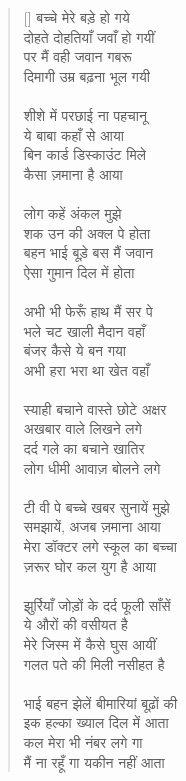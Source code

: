 \begin{verse}[\versewidth]\texthindi{
बच्चे मेरे बड़े हो गये\\
दोहते दोहतियाँ जवाँ हो गयीं\\
पर मैं वही जवान गबरू\\
दिमागी उम्र बढ़ना भूल गयी\\
\\
शीशे में परछाई ना पहचानू\\
ये बाबा कहाँ से आया\\
बिन कार्ड डिस्काउंट मिले\\
कैसा ज़माना है आया\\
\\
लोग कहें अंकल मुझे\\
शक उन की अक्ल पे होता\\
बहन भाई बूड़े बस मैं जवान\\
ऐसा गुमान दिल में होता\\
\\
अभी भी फेरूँ हाथ मैं सर पे\\
भले चट खाली मैदान वहाँ\\
बंजर कैसे ये बन गया\\
अभी हरा भरा था खेत वहाँ\\
\\
स्याही बचाने वास्ते छोटे अक्षर\\
अखबार वाले लिखने लगे\\
दर्द गले का बचाने खातिर\\
लोग धीमी आवाज़ बोलने लगे\\
\\
टी वी पे बच्चे खबर सुनायें मुझे\\
समझायें, अजब ज़माना आया\\
मेरा डॉक्टर लगे स्कूल का बच्चा\\
ज़रूर घोर कल युग है आया\\
\\
झुर्रियाँ जोड़ों के दर्द फूली साँसें\\
ये औरों की वसीयत है\\
मेरे जिस्म में कैसे घुस आयीं\\
गलत पते की मिली नसीहत है\\
\\
 भाई बहन झेलें बीमारियां बूढ़ों की\\
इक हल्का ख्याल दिल में आता\\
कल मेरा भी नंबर लगे गा\\
मैं ना रहूँ गा यकीन नहीं आता\\
}
\end{verse}
